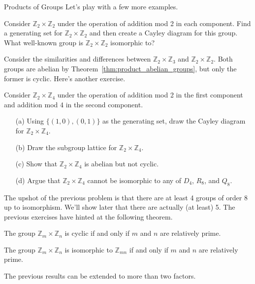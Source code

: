 \begin{section}{Products of Groups}
Let's play with a few more examples.

\begin{exercise}
Consider $\mathbb{Z}_2\times \mathbb{Z}_2$ under the operation of addition mod 2 in each component.  Find a generating set for $\mathbb{Z}_2\times \mathbb{Z}_2$ and then create a Cayley diagram for this group.  What well-known group is $\mathbb{Z}_2\times \mathbb{Z}_2$ isomorphic to?
\end{exercise}

Consider the similarities and differences between $\mathbb{Z}_2\times \mathbb{Z}_3$ and $\mathbb{Z}_2\times \mathbb{Z}_2$.  Both groups are abelian by Theorem~\ref{thm:product_abelian_groups}, but only the former is cyclic.  Here's another exercise.

\begin{problem}
Consider $\mathbb{Z}_2\times \mathbb{Z}_4$ under the operation of addition mod 2 in the first component and addition mod 4 in the second component. 
\begin{enumerate}
\item[(a)] Using $\{(1,0),(0,1)\}$ as the generating set, draw the Cayley diagram for $\mathbb{Z}_2\times \mathbb{Z}_4$.
\item[(b)] Draw the subgroup lattice for $\mathbb{Z}_2\times \mathbb{Z}_4$.
\item[(c)] Show that $\mathbb{Z}_2\times \mathbb{Z}_4$ is abelian but not cyclic.
\item[(d)] Argue that $\mathbb{Z}_2\times \mathbb{Z}_4$ cannot be isomorphic to any of $D_4$, $R_8$, and $Q_8$.
\end{enumerate}
\end{problem}

The upshot of the previous problem is that there are at least 4 groups of order 8 up to isomorphism.  We'll show later that there are actually (at least) 5. The previous exercises have hinted at the following theorem.

\begin{theorem}
The group $\mathbb{Z}_m\times \mathbb{Z}_n$ is cyclic if and only if $m$ and $n$ are relatively prime.
\end{theorem}

\begin{corollary}
The group $\mathbb{Z}_m\times \mathbb{Z}_n$ is isomorphic to $\mathbb{Z}_{mn}$ if and only if $m$ and $n$ are relatively prime.
\end{corollary}

The previous results can be extended to more than two factors.


\end{section}
